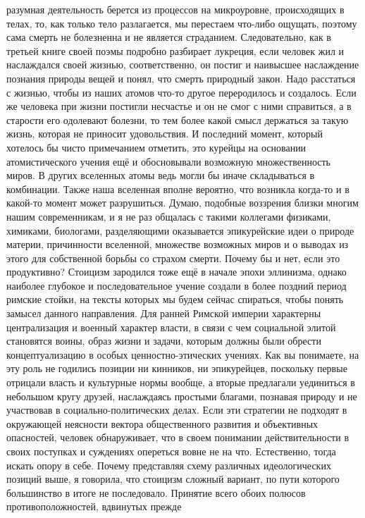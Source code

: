 разумная деятельность берется из процессов на микроуровне, происходящих в телах,
то, как только тело разлагается, мы перестаем что-либо ощущать, поэтому сама
смерть не болезненна и не является страданием. Следовательно, как в третьей
книге своей поэмы подробно разбирает лукреция, если человек жил и наслаждался
своей жизнью, соответственно, он постиг и наивысшее наслаждение познания природы
вещей и понял, что смерть природный закон. Надо расстаться с жизнью, чтобы из
наших атомов что-то другое переродилось и создалось. Если же человека при жизни
постигли несчастье и он не смог с ними справиться, а в старости его одолевают
болезни, то тем более какой смысл держаться за такую жизнь, которая не приносит
удовольствия. И последний момент, который хотелось бы чисто примечанием
отметить, это курейцы на основании атомистического учения ещё и обосновывали
возможную множественность миров. В других вселенных атомы ведь могли бы иначе
складываться в комбинации. Также наша вселенная вполне вероятно, что возникла
когда-то и в какой-то момент может разрушиться. Думаю, подобные воззрения близки
многим нашим современникам, и я не раз общалась с такими коллегами физиками,
химиками, биологами, разделяющими оказывается эпикурейские идеи о природе
материи, причинности вселенной, множестве возможных миров и о выводах из этого
для собственной борьбы со страхом смерти. Почему бы и нет, если это продуктивно?
Стоицизм зародился тоже ещё в начале эпохи эллинизма, однако наиболее глубокое и
последовательное учение создали в более поздний период римские стойки, на тексты
которых мы будем сейчас спираться, чтобы понять замысел данного направления. Для
ранней Римской империи характерны централизация и военный характер власти, в
связи с чем социальной элитой становятся воины, образ жизни и задачи, которым
должны были обрести концептуализацию в особых ценностно-этических учениях. Как
вы понимаете, на эту роль не годились позиции ни кинников, ни эпикурейцев,
поскольку первые отрицали власть и культурные нормы вообще, а вторые предлагали
уединиться в небольшом кругу друзей, наслаждаясь простыми благами, познавая
природу и не участвовав в социально-политических делах. Если эти стратегии не
подходят в окружающей неясности вектора общественного развития и объективных
опасностей, человек обнаруживает, что в своем понимании действительности в своих
поступках и суждениях опереться вовне не на что. Естественно, тогда искать опору
в себе. Почему представляя схему различных идеологических позиций выше, я
говорила, что стоицизм сложный вариант, по пути которого большинство в итоге не
последовало. Принятие всего обоих полюсов противоположностей, вдвинутых прежде
